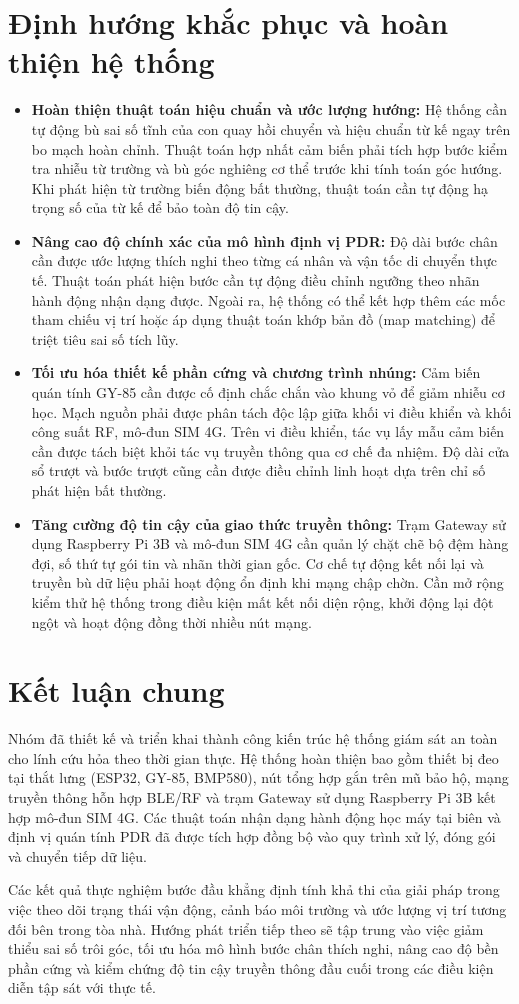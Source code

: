 \section{Định hướng khắc phục và hoàn thiện hệ thống}\label{sec:improvement}
\begin{itemize}
\item \textbf{Hoàn thiện thuật toán hiệu chuẩn và ước lượng hướng:} Hệ thống cần tự động bù sai số tĩnh của con quay hồi chuyển và hiệu chuẩn từ kế ngay trên bo mạch hoàn chỉnh. Thuật toán hợp nhất cảm biến phải tích hợp bước kiểm tra nhiễu từ trường và bù góc nghiêng cơ thể trước khi tính toán góc hướng. Khi phát hiện từ trường biến động bất thường, thuật toán cần tự động hạ trọng số của từ kế để bảo toàn độ tin cậy.
\item \textbf{Nâng cao độ chính xác của mô hình định vị PDR:} Độ dài bước chân cần được ước lượng thích nghi theo từng cá nhân và vận tốc di chuyển thực tế. Thuật toán phát hiện bước cần tự động điều chỉnh ngưỡng theo nhãn hành động nhận dạng được. Ngoài ra, hệ thống có thể kết hợp thêm các mốc tham chiếu vị trí hoặc áp dụng thuật toán khớp bản đồ (map matching) để triệt tiêu sai số tích lũy.
\item \textbf{Tối ưu hóa thiết kế phần cứng và chương trình nhúng:} Cảm biến quán tính GY-85 cần được cố định chắc chắn vào khung vỏ để giảm nhiễu cơ học. Mạch nguồn phải được phân tách độc lập giữa khối vi điều khiển và khối công suất RF, mô-đun SIM 4G. Trên vi điều khiển, tác vụ lấy mẫu cảm biến cần được tách biệt khỏi tác vụ truyền thông qua cơ chế đa nhiệm. Độ dài cửa sổ trượt và bước trượt cũng cần được điều chỉnh linh hoạt dựa trên chỉ số phát hiện bất thường.
\item \textbf{Tăng cường độ tin cậy của giao thức truyền thông:} Trạm Gateway sử dụng Raspberry Pi 3B và mô-đun SIM 4G cần quản lý chặt chẽ bộ đệm hàng đợi, số thứ tự gói tin và nhãn thời gian gốc. Cơ chế tự động kết nối lại và truyền bù dữ liệu phải hoạt động ổn định khi mạng chập chờn. Cần mở rộng kiểm thử hệ thống trong điều kiện mất kết nối diện rộng, khởi động lại đột ngột và hoạt động đồng thời nhiều nút mạng. 
\end{itemize}

\section{Kết luận chung}
Nhóm đã thiết kế và triển khai thành công kiến trúc hệ thống giám sát an toàn cho lính cứu hỏa theo thời gian thực. Hệ thống hoàn thiện bao gồm thiết bị đeo tại thắt lưng (ESP32, GY-85, BMP580), nút tổng hợp gắn trên mũ bảo hộ, mạng truyền thông hỗn hợp BLE/RF và trạm Gateway sử dụng Raspberry Pi 3B kết hợp mô-đun SIM 4G. Các thuật toán nhận dạng hành động học máy tại biên và định vị quán tính PDR đã được tích hợp đồng bộ vào quy trình xử lý, đóng gói và chuyển tiếp dữ liệu.

Các kết quả thực nghiệm bước đầu khẳng định tính khả thi của giải pháp trong việc theo dõi trạng thái vận động, cảnh báo môi trường và ước lượng vị trí tương đối bên trong tòa nhà. Hướng phát triển tiếp theo sẽ tập trung vào việc giảm thiểu sai số trôi góc, tối ưu hóa mô hình bước chân thích nghi, nâng cao độ bền phần cứng và kiểm chứng độ tin cậy truyền thông đầu cuối trong các điều kiện diễn tập sát với thực tế.
